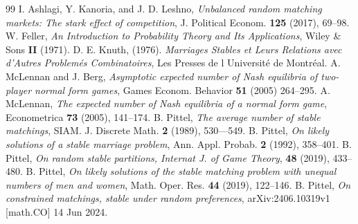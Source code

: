 \documentclass[11pt]{amsart}
\theoremstyle{remark}
\numberwithin{equation}{section}
\begin{document}
\begin{thebibliography}{99}
I. Ashlagi, Y. Kanoria, and J. D. Leshno,  \textit{Unbalanced random matching markets: The stark effect of competition}, J. Political Econom. {\bf 125} (2017), 69--98. 
W. Feller, \textit{An Introduction to Probability Theory and Its Applications}, Wiley \& Sons {\bf II} (1971).
D. E. Knuth, (1976). \textit{Marriages Stables et Leurs Relations avec d'Autres Problem\'es Combinatoires}, Les Presses de l Universit\'e de Montr\'eal.
A. McLennan and J. Berg, \textit{Asymptotic expected number of Nash equilibria of two-player normal form games}, Games Econom. Behavior {\bf 51} (2005) 264--295. 
A.  McLennan, \textit{The expected number of Nash equilibria of a normal form game}, Econometrica {\bf 73} (2005),  141--174.
B. Pittel, \textit{The average number of stable matchings},  SIAM. J. Discrete Math. {\bf 2} (1989), 530---549.
B. Pittel, \textit{On likely solutions of a stable marriage problem}, Ann. Appl. Probab. {\bf 2} (1992), 358--401.
B. Pittel, \textit{On random stable partitions, Internat J. of Game Theory}, {\bf 48} (2019), 433--480.
B. Pittel, \textit{On likely solutions of the stable matching problem with unequal numbers of men and women},
Math. Oper. Res. {\bf 44} (2019), 122–146.
B. Pittel, \textit{On constrained matchings, stable under random preferences}, arXiv:2406.10319v1 [math.CO] 14 Jun 2024.
\end{thebibliography}
\end{document}
